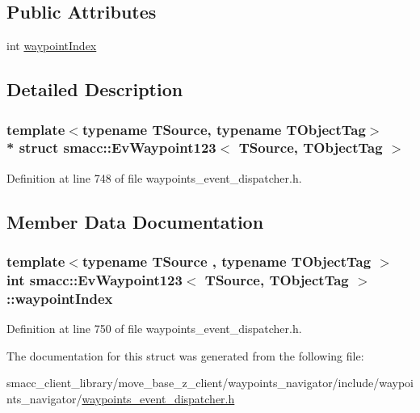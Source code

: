 \subsection*{Public Attributes}
\begin{DoxyCompactItemize}
\item 
int \hyperlink{structsmacc_1_1EvWaypoint123_a52985c59f35857b009d9de6b18eb51ff}{waypoint\+Index}
\end{DoxyCompactItemize}


\subsection{Detailed Description}
\subsubsection*{template$<$typename T\+Source, typename T\+Object\+Tag$>$\\*
struct smacc\+::\+Ev\+Waypoint123$<$ T\+Source, T\+Object\+Tag $>$}



Definition at line 748 of file waypoints\+\_\+event\+\_\+dispatcher.\+h.



\subsection{Member Data Documentation}
\subsubsection[{\texorpdfstring{waypoint\+Index}{waypointIndex}}]{\setlength{\rightskip}{0pt plus 5cm}template$<$typename T\+Source , typename T\+Object\+Tag $>$ int {\bf smacc\+::\+Ev\+Waypoint123}$<$ T\+Source, T\+Object\+Tag $>$\+::waypoint\+Index}\hypertarget{structsmacc_1_1EvWaypoint123_a52985c59f35857b009d9de6b18eb51ff}{}\label{structsmacc_1_1EvWaypoint123_a52985c59f35857b009d9de6b18eb51ff}


Definition at line 750 of file waypoints\+\_\+event\+\_\+dispatcher.\+h.



The documentation for this struct was generated from the following file\+:\begin{DoxyCompactItemize}
\item 
smacc\+\_\+client\+\_\+library/move\+\_\+base\+\_\+z\+\_\+client/waypoints\+\_\+navigator/include/waypoints\+\_\+navigator/\hyperlink{waypoints__event__dispatcher_8h}{waypoints\+\_\+event\+\_\+dispatcher.\+h}\end{DoxyCompactItemize}

